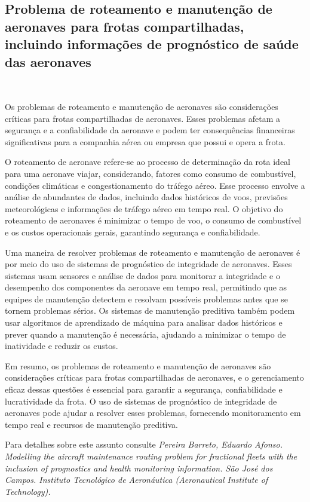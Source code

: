 \documentclass{amsart}
\begin{document}
\subsection{Problema de roteamento e manutenção de aeronaves para frotas compartilhadas, incluindo informações de prognóstico de saúde das aeronaves}\

Os problemas de roteamento e manutenção de aeronaves são considerações críticas para frotas compartilhadas de aeronaves. Esses problemas afetam a segurança e a confiabilidade da aeronave e podem ter consequências financeiras significativas para a companhia aérea ou empresa que possui e opera a frota.

O roteamento de aeronave refere-se ao processo de determinação da rota ideal para uma aeronave viajar, considerando, fatores como consumo de combustível, condições climáticas e congestionamento do tráfego aéreo. Esse processo envolve a análise de abundantes de dados, incluindo dados históricos de voos, previsões meteorológicas e informações de tráfego aéreo em tempo real. O objetivo do roteamento de aeronaves é minimizar o tempo de voo, o consumo de combustível e os custos operacionais gerais, garantindo segurança e confiabilidade.

Uma maneira de resolver problemas de roteamento e manutenção de aeronaves é por meio do uso de sistemas de prognóstico de integridade de aeronaves. Esses sistemas usam sensores e análise de dados para monitorar a integridade e o desempenho dos componentes da aeronave em tempo real, permitindo que as equipes de manutenção detectem e resolvam possíveis problemas antes que se tornem problemas sérios. Os sistemas de manutenção preditiva também podem usar algoritmos de aprendizado de máquina para analisar dados históricos e prever quando a manutenção é necessária, ajudando a minimizar o tempo de inatividade e reduzir os custos.

Em resumo, os problemas de roteamento e manutenção de aeronaves são considerações críticas para frotas compartilhadas de aeronaves, e o gerenciamento eficaz dessas questões é essencial para garantir a segurança, confiabilidade e lucratividade da frota. O uso de sistemas de prognóstico de integridade de aeronaves pode ajudar a resolver esses problemas, fornecendo monitoramento em tempo real e recursos de manutenção preditiva.

Para detalhes sobre este assunto consulte {\it Pereira Barreto, Eduardo Afonso. Modelling the aircraft maintenance routing problem for fractional fleets with the inclusion of prognostics and health monitoring information. São José dos Campos. Instituto Tecnológico de Aeronáutica (Aeronautical Institute of Technology).}
\end{document}
